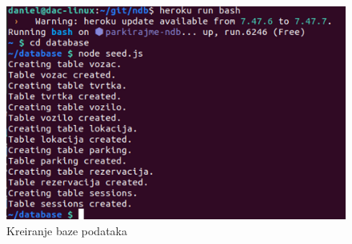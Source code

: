 	\begin{figure}[H]
		\includegraphics[scale=0.8]{slike/heroku_s2.png} %
		\centering
		\caption{Kreiranje baze podataka}
		\label{fig:Upravljanje Heroku-om 2}
	\end{figure}
			
			\eject 